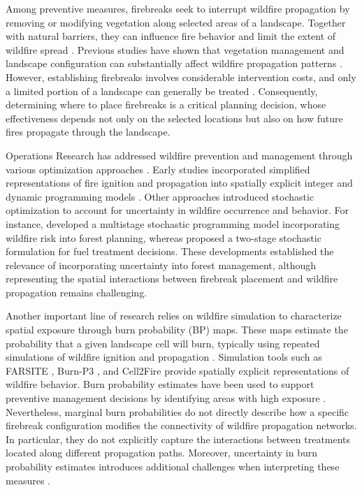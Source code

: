 \documentclass[a4paper,fleqn]{cas-sc}
\begin{document}
Among preventive measures, firebreaks seek to interrupt wildfire
propagation by removing or modifying vegetation along selected
areas of a landscape. Together with natural barriers, they
can influence fire behavior and limit the extent of wildfire
spread \citep{agee2000use}. Previous studies have shown that
vegetation management and landscape configuration can
substantially affect wildfire propagation patterns
\citep{amiro2001fire,kim2009spatial,cheney1993influence,
carrasco2023firebreak}. However, establishing firebreaks
involves considerable intervention costs, and only a limited
portion of a landscape can generally be treated
\citep{oliveira2016assessing}. Consequently, determining
where to place firebreaks is a critical planning decision,
whose effectiveness depends not only on the selected
locations but also on how future fires propagate
through the landscape.

Operations Research has addressed wildfire prevention and
management through various optimization approaches
\citep{martell2007forest,ronnqvist2015operations}.
Early studies incorporated simplified representations of
fire ignition and propagation into spatially explicit
integer and dynamic programming models
\citep{bettinger2009,kim2009spatial,konoshima2008spatial,
gonzalez2011integrating}. Other approaches introduced
stochastic optimization to account for uncertainty in
wildfire occurrence and behavior. For instance,
\citet{boychuk1996multistage} developed a multistage
stochastic programming model incorporating wildfire risk
into forest planning, whereas \citet{kabli2015stochastic}
proposed a two-stage stochastic formulation for fuel
treatment decisions. These developments established the
relevance of incorporating uncertainty into forest
management, although representing the spatial interactions
between firebreak placement and wildfire propagation
remains challenging.

Another important line of research relies on wildfire
simulation to characterize spatial exposure through
burn probability (BP) maps. These maps estimate the
probability that a given landscape cell will burn,
typically using repeated simulations of wildfire
ignition and propagation
\citep{parisien2005mapping,finney2005challenge}.
Simulation tools such as FARSITE \citep{finney1998farsite},
Burn-P3 \citep{parisien2005mapping}, and Cell2Fire
\citep{pais2021cell2fire} provide spatially explicit
representations of wildfire behavior. Burn probability
estimates have been used to support preventive management
decisions by identifying areas with high exposure
\citep{ager2010comparison,oliveira2016assessing}.
Nevertheless, marginal burn probabilities do not directly
describe how a specific firebreak configuration modifies
the connectivity of wildfire propagation networks.
In particular, they do not explicitly capture the
interactions between treatments located along different
propagation paths. Moreover, uncertainty in burn
probability estimates introduces additional challenges
when interpreting these measures
\citep{kuhlmann2015generating}.
\end{document}
